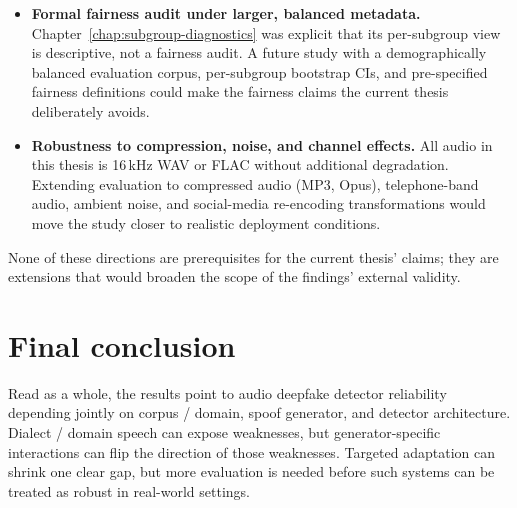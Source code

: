\begin{itemize}
        detector performance, not human-perceptual quality
        (Chapter~\ref{chap:discussion}, Section~\ref{sec:discussion-construct-validity}). A companion human-listener
        study would measure whether the OpenVoice failure mode
        observed for the detector also corresponds to a specific
        human-perceptual quality difference against DECTE and VCTK.
    \item \textbf{Formal fairness audit under larger, balanced metadata.}
        Chapter~\ref{chap:subgroup-diagnostics} was explicit that its per-subgroup view is
        descriptive, not a fairness audit. A future study with a
        demographically balanced evaluation corpus, per-subgroup
        bootstrap CIs, and pre-specified fairness definitions could
        make the fairness claims the current thesis deliberately
        avoids.
    \item \textbf{Robustness to compression, noise, and channel effects.}
        All audio in this thesis is 16\,kHz WAV or FLAC without
        additional degradation. Extending evaluation to compressed
        audio (MP3, Opus), telephone-band audio, ambient noise, and
        social-media re-encoding transformations would move the
        study closer to realistic deployment conditions.
\end{itemize}

None of these directions are prerequisites for the current
thesis' claims; they are extensions that would broaden the
scope of the findings' external validity.


\section{Final conclusion}
\label{sec:conclusion-final}

Read as a whole, the results point to audio deepfake detector
reliability depending jointly on corpus / domain, spoof generator,
and detector architecture. Dialect / domain speech can expose
weaknesses, but generator-specific interactions can flip the
direction of those weaknesses. Targeted adaptation can shrink one
clear gap, but more evaluation is needed before such systems can
be treated as robust in real-world settings.
